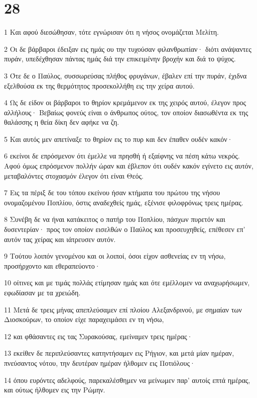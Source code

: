\chapter{28}

\par 1 Και αφού διεσώθησαν, τότε εγνώρισαν ότι η νήσος ονομάζεται Μελίτη.
\par 2 Οι δε βάρβαροι έδειξαν εις ημάς ου την τυχούσαν φιλανθρωπίαν· διότι ανάψαντες πυράν, υπεδέχθησαν πάντας ημάς διά την επικειμένην βροχήν και διά το ψύχος.
\par 3 Ότε δε ο Παύλος, συσσωρεύσας πλήθος φρυγάνων, έβαλεν επί την πυράν, έχιδνα εξελθούσα εκ της θερμότητος προσεκολλήθη εις την χείρα αυτού.
\par 4 Ως δε είδον οι βάρβαροι το θηρίον κρεμάμενον εκ της χειρός αυτού, έλεγον προς αλλήλους· Βεβαίως φονεύς είναι ο άνθρωπος ούτος, τον οποίον διασωθέντα εκ της θαλάσσης η θεία δίκη δεν αφήκε να ζη.
\par 5 Και αυτός μεν απετίναξε το θηρίον εις το πυρ και δεν έπαθεν ουδέν κακόν·
\par 6 εκείνοι δε επρόσμενον ότι έμελλε να πρησθή ή εξαίφνης να πέση κάτω νεκρός. Αφού όμως επρόσμενον πολλήν ώραν και έβλεπον ότι ουδέν κακόν εγίνετο εις αυτόν, μεταβαλόντες στοχασμόν έλεγον ότι είναι Θεός.
\par 7 Εις τα πέριξ δε του τόπου εκείνου ήσαν κτήματα του πρώτου της νήσου ονομαζομένου Ποπλίου, όστις αναδεχθείς ημάς, εξένισε φιλοφρόνως τρεις ημέρας.
\par 8 Συνέβη δε να ήναι κατάκειτος ο πατήρ του Ποπλίου, πάσχων πυρετόν και δυσεντερίαν· προς τον οποίον εισελθών ο Παύλος και προσευχηθείς, επέθεσεν επ' αυτόν τας χείρας και ιάτρευσεν αυτόν.
\par 9 Τούτου λοιπόν γενομένου και οι λοιποί, όσοι είχον ασθενείας εν τη νήσω, προσήρχοντο και εθεραπεύοντο·
\par 10 οίτινες και με τιμάς πολλάς ετίμησαν ημάς και ότε εμέλλομεν να αναχωρήσωμεν, εφωδίασαν με τα χρειώδη.
\par 11 Μετά δε τρεις μήνας απεπλεύσαμεν επί πλοίου Αλεξανδρινού, με σημαίαν των Διοσκούρων, το οποίον είχε παραχειμάσει εν τη νήσω,
\par 12 και φθάσαντες εις τας Συρακούσας, εμείναμεν τρεις ημέρας·
\par 13 εκείθεν δε περιπλεύσαντες κατηντήσαμεν εις Ρήγιον, και μετά μίαν ημέραν, πνεύσαντος νότου, την δευτέραν ημέραν ήλθομεν εις Ποτιόλους·
\par 14 όπου ευρόντες αδελφούς, παρεκαλέσθημεν να μείνωμεν παρ' αυτοίς επτά ημέρας, και ούτως ήλθομεν εις την Ρώμην.
